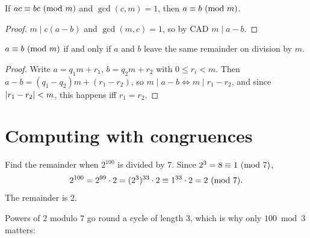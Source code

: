\begin{proposition}
If $ac \equiv bc \ (\mathrm{mod}\ m)$ and $\gcd(c,m) = 1$, then $a \equiv b \ (\mathrm{mod}\ m)$.
\end{proposition}
\begin{proof}
$m \mid c(a - b)$ and $\gcd(m,c) = 1$, so by CAD $m \mid a - b$.
\end{proof}

\begin{proposition}
$a \equiv b \ (\mathrm{mod}\ m)$ if and only if $a$ and $b$ leave the same remainder on division by $m$.
\end{proposition}
\begin{proof}
Write $a = q_1m + r_1$, $b = q_2m + r_2$ with $0 \le r_i < m$. Then
$a - b = (q_1 - q_2)m + (r_1 - r_2)$, so $m \mid a - b \iff m \mid r_1 - r_2$, and since
$\left\lvert r_1 - r_2 \right\rvert < m$, this happens iff $r_1 = r_2$.
\end{proof}

\section{Computing with congruences}

\begin{example}
Find the remainder when $2^{100}$ is divided by $7$. Since $2^3 = 8 \equiv 1 \ (\mathrm{mod}\ 7)$,
\[ 2^{100} = 2^{99}\cdot 2 = (2^3)^{33}\cdot 2 \equiv 1^{33}\cdot 2 = 2 \ (\mathrm{mod}\ 7). \]
The remainder is $2$.
\end{example}

Powers of $2$ modulo $7$ go round a cycle of length $3$, which is why only $100 \bmod 3$
matters:
\begin{center}
\end{center}

